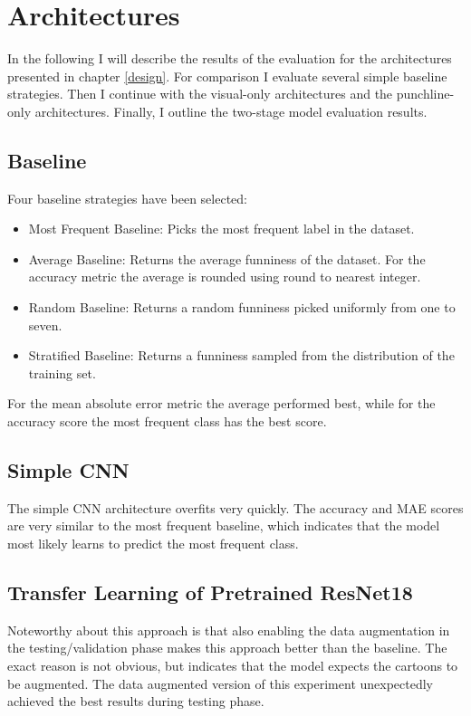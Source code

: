 \documentclass[draft,final,oneside]{vutinfth} %
\begin{document}



\section{Architectures}
In the following I will describe the results of the evaluation for the architectures presented in chapter \ref{design}. For comparison I evaluate several simple baseline strategies. Then I continue with the visual-only architectures and the punchline-only architectures. Finally, I outline the two-stage model evaluation results.

\subsection{Baseline}

Four baseline strategies have been selected: 

\begin{itemize}

\item Most Frequent Baseline: Picks the most frequent label in the dataset.
\item Average Baseline: Returns the average funniness of the dataset. For the accuracy metric the average is rounded using round to nearest integer.
\item Random Baseline: Returns a random funniness picked uniformly from one to seven.
\item Stratified Baseline: Returns a funniness sampled from the distribution of the
training set.

\end{itemize}

For the mean absolute error metric the average performed best, while for the accuracy score the most frequent class has the best score.

\subsection{Simple CNN}
The simple CNN architecture overfits very quickly. The accuracy and MAE scores are very similar to the most frequent baseline, which indicates that the model most likely learns to predict the most frequent class.

\subsection{Transfer Learning of Pretrained ResNet18}
Noteworthy about this approach is that also enabling the data augmentation in the testing/validation phase makes this approach better than the baseline. The exact reason is not obvious, but indicates that the model expects the cartoons to be augmented. The data augmented version of this experiment unexpectedly achieved the best results during testing phase.
\end{document}
